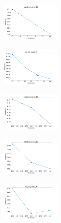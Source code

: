 \begin{figure}[H]
\begin{subfigure}
    \end{subfigure}
    \hfill
    \begin{subfigure}
        \centering
        \includegraphics[width=0.32\textwidth]{img/copkm2/rand_set_const_10_589741062_time.png}
    \end{subfigure}
    \hfill
    \begin{subfigure}
        \centering
        \includegraphics[width=0.32\textwidth]{img/copkm2/iris_set_const_10_277451237_time.png}
    \end{subfigure}
    \hfill
    \begin{subfigure}
        \centering
        \includegraphics[width=0.32\textwidth]{img/copkm2/ecoli_set_const_10_277451237_time.png}
    \end{subfigure}
    \hfill
    \begin{subfigure}
        \centering
        \includegraphics[width=0.32\textwidth]{img/copkm2/rand_set_const_10_277451237_time.png}
    \end{subfigure}
    \hfill
    \begin{subfigure}
        \centering
        \includegraphics[width=0.32\textwidth]{img/copkm2/iris_set_const_10_49258669_time.png}

\end{subfigure}
\end{figure}
